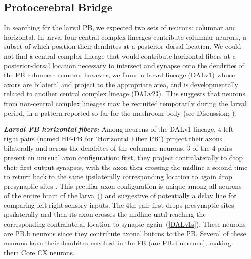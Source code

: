     \subsection{Protocerebral Bridge}
    \label{PB}
    In searching for the larval PB, we expected two sets of neurons: columnar and horizontal. In larva, four central complex lineages contribute columnar neurons, a subset of which position their dendrites at a posterior-dorsal location. We could not find a central complex lineage that would contribute horizontal fibers at a posterior-dorsal location necessary to intersect and synapse onto the dendrites of the PB columnar neurons; however, we found a larval lineage (DALv1) whose axons are bilateral and project to the appropriate area, and is developmentally related to another central complex lineage (DALv23). This suggests that neurons from non-central complex lineages may be recruited temporarily during the larval period, in a pattern reported so far for the mushroom body (see Discussion; \citep{truman2023metamorphosis}). 

    \textbf{\textit{Larval PB horizontal fibers:}}
    Among neurons of the DALv1 lineage, 4 left-right pairs (named HF-PB for "Horizontal Fiber PB") project their axons bilaterally and across the dendrites of the columnar neurons.
    3 of the 4 pairs present an unusual axon configuration: first, they project contralaterally to drop their first output synapses, with the axon then crossing the midline a second time to return back to the same ipsilaterally corresponding location to again drop presynaptic sites .
    This peculiar axon configuration is unique among all neurons of the entire brain of the larva~(\citep{winding2023connectome}) and suggestive of potentially a delay line for comparing left-right sensory inputs.
    The 4th pair first drops presynaptic sites ipsilaterally and then its axon crosses the midline until reaching the corresponding contralateral location to synapse again~(\ref{DALv1s}). These neurons are PB.b neurons since they contribute axonal butons to the PB. Several of these neurons have their dendrites encolsed in the FB (are FB.d neurons), making them Core CX neurons. 

